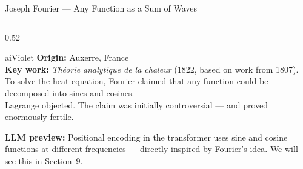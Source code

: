 \begin{frame}[shrink=14]{Joseph Fourier --- Any Function as a Sum of Waves}

  \begin{columns}[T]
    \begin{column}{0.52\textwidth}
      \begin{personbox}{aiViolet}
        \textbf{Origin:} Auxerre, France\\[3pt]
        \textbf{Key work:} \emph{Th\'eorie analytique de la chaleur}
        (1822, based on work from 1807). To solve the heat equation,
        Fourier claimed that \alert{any function} could be decomposed
        into sines and cosines.\\[3pt]
        Lagrange objected. The claim was initially controversial ---
        and proved enormously fertile.
      \end{personbox}

      \vspace{0.4em}
      \begin{insightbox}
        \textbf{LLM preview:} Positional encoding in the transformer
        uses sine and cosine functions at different frequencies ---
        directly inspired by Fourier's idea. We will see this in
        Section~9.
      \end{insightbox}
    \end{column}


\end{columns}
\end{frame}
